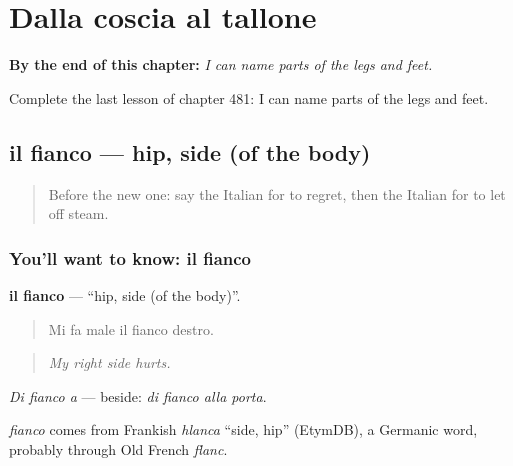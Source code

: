 
\chapter{Dalla coscia al tallone}
\label{ch:it-dalla-coscia-al-tallone}

\begin{chapteropening}
\textbf{By the end of this chapter:} \emph{I can name parts of the legs and feet.}

Complete the last lesson of chapter 481: I can name parts of the legs and feet.
\end{chapteropening}

\section[il fianco]{il fianco — hip, side (of the body)}

\label{lesson:IT-C481-fianco}



\begin{quote}
Before the new one: say the Italian for to regret, then the Italian for to let off steam.
\end{quote}

\subsection*{You'll want to know: il fianco}
\textbf{il fianco} — \textquotedblleft{}hip, side (of the body)\textquotedblright{}.

\begin{quote}
Mi fa male il fianco destro.
\end{quote}

\begin{quote}
\emph{My right side hurts.}
\end{quote}

\emph{Di fianco a} — beside: \emph{di fianco alla porta}.

\begin{cousinweb}
\emph{fianco} comes from Frankish \emph{hlanca} \textquotedblleft{}side, hip\textquotedblright{} (EtymDB), a Germanic word, probably through Old French \emph{flanc}.
\end{cousinweb}

